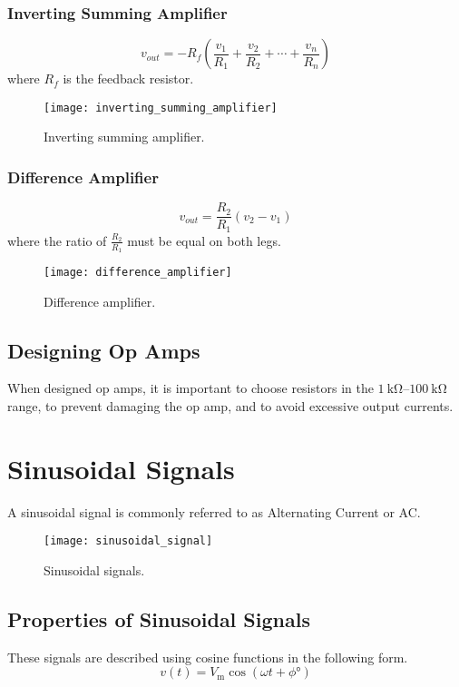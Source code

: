 \documentclass{article}
\begin{document}
\subsubsection{Inverting Summing Amplifier}
\begin{equation*}
    v_{out} = -R_f \left( \frac{v_1}{R_1} + \frac{v_2}{R_2} + \cdots + \frac{v_n}{R_n} \right)
\end{equation*}
where $R_f$ is the feedback resistor.
\begin{figure}[H]
    \centering
    \texttt{[image: inverting\_summing\_amplifier]}
    \caption{Inverting summing amplifier.}
\end{figure}
\subsubsection{Difference Amplifier}
\begin{equation*}
    v_{out} = \frac{R_2}{R_1} \left( v_2 - v_1 \right)
\end{equation*}
where the ratio of $\displaystyle \frac{R_2}{R_1}$ must be equal on both legs.
\begin{figure}[H]
    \centering
    \texttt{[image: difference\_amplifier]}
    \caption{Difference amplifier.}
\end{figure}
\subsection{Designing Op Amps}
When designed op amps, it is important to choose resistors in the $\qtyrange{1}{100}{\kilo\ohm}$
range, to prevent damaging the op amp, and to avoid excessive output currents.
\newpage
\section{Sinusoidal Signals}
\begin{definition}
    A sinusoidal signal is commonly referred to as Alternating Current or AC.
\end{definition}
\begin{figure}[H]
    \centering
    \texttt{[image: sinusoidal\_signal]}
    \caption{Sinusoidal signals.}
\end{figure}
\subsection{Properties of Sinusoidal Signals}
These signals are described using cosine functions in the following form.
\begin{equation*}
    v(t) = V_{\mathrm{m}} \cos{\left( \omega t + \phi\si{\degree} \right)}
\end{equation*}
\end{document}
